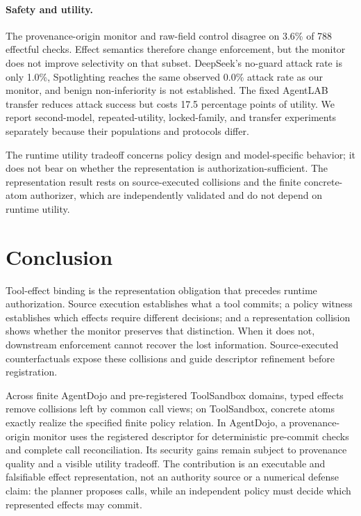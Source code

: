 \documentclass[letterpaper,twocolumn,10pt]{article}
\theoremstyle{definition}
\begin{document}
\paragraph{Safety and utility.}
The provenance-origin monitor and raw-field control disagree on 3.6\% of 788
effectful checks.  Effect semantics therefore change enforcement, but the
monitor does not improve selectivity on that subset.  DeepSeek's no-guard
attack rate is only 1.0\%, Spotlighting reaches the same observed 0.0\% attack
rate as our monitor, and benign non-inferiority is not established.  The fixed
AgentLAB transfer reduces attack success but costs 17.5 percentage points of
utility.  We report second-model, repeated-utility, locked-family, and transfer
experiments separately because their populations and protocols differ.

The runtime utility tradeoff concerns policy design and model-specific
behavior; it does not bear on whether the representation is
authorization-sufficient.  The representation result rests on source-executed
collisions and the finite concrete-atom authorizer, which are independently
validated and do not depend on runtime utility.

\section{Conclusion}

Tool-effect binding is the representation obligation that precedes runtime
authorization.  Source execution establishes what a tool commits; a policy
witness establishes which effects require different decisions; and a
representation collision shows whether the monitor preserves that distinction.
When it does not, downstream enforcement cannot recover the lost information.
Source-executed counterfactuals expose these collisions and guide descriptor
refinement before registration.

Across finite AgentDojo and pre-registered ToolSandbox domains, typed effects
remove collisions left by common call views; on ToolSandbox, concrete atoms
exactly realize the specified finite policy relation.  In AgentDojo, a
provenance-origin monitor uses the registered descriptor for deterministic
pre-commit checks and complete call reconciliation.  Its security gains remain
subject to provenance quality and a visible utility tradeoff.  The contribution
is an executable and falsifiable effect representation, not an authority source
or a numerical defense claim:
the planner proposes calls, while an independent policy must decide which
represented effects may commit.
\label{technical-body-end}
\end{document}
